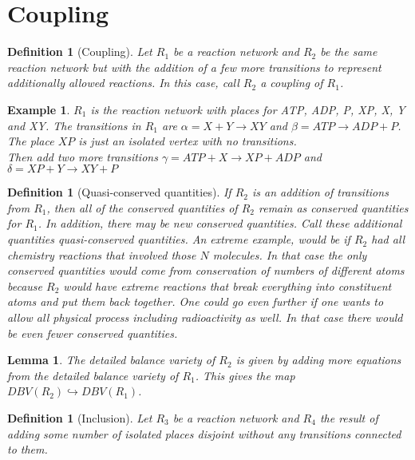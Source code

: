 \documentclass[11pt]{book}
\theoremstyle{change}
\newtheorem{definition}[equation]{Definition}
\newtheorem{lemma}[equation]{Lemma}
\newtheorem{example}[equation]{Example}
\theoremstyle{nonumberplain}
\numberwithin{equation}{section}
\begin{document}
\section{Coupling}

\begin{definition}[Coupling]
Let $R_1$ be a reaction network and $R_2$ be the same reaction network but with the addition of a few more transitions to represent additionally allowed reactions. In this case, call $R_2$ a coupling of $R_1$.
\end{definition}

\begin{example}
$R_1$ is the reaction network with places for ATP, ADP, P, XP, X, Y and XY. The transitions in $R_1$ are $\alpha = X + Y \to XY$ and $\beta = ATP \to ADP + P$. The place $XP$ is just an isolated vertex with no transitions.\\

Then add two more transitions $\gamma = ATP + X \to XP + ADP$ and $\delta = XP + Y \to XY + P$
\end{example}

\begin{definition}[Quasi-conserved quantities]
If $R_2$ is an addition of transitions from $R_1$, then all of the conserved quantities of $R_2$ remain as conserved quantities for $R_1$. In addition, there may be new conserved quantities. Call these additional quantities quasi-conserved quantities. An extreme example, would be if $R_2$ had all chemistry reactions that involved those $N$ molecules. In that case the only conserved quantities would come from conservation of numbers of different atoms because $R_2$ would have extreme reactions that break everything into constituent atoms and put them back together. One could go even further if one wants to allow all physical process including radioactivity as well. In that case there would be even fewer conserved quantities.
\end{definition}

\begin{lemma}
The detailed balance variety of $R_2$ is given by adding more equations from the detailed balance variety of $R_1$. This gives the map $DBV(R_2) \hookrightarrow DBV(R_1)$.
\end{lemma}

\begin{definition}[Inclusion]
Let $R_3$ be a reaction network and $R_4$ the result of adding some number of isolated places disjoint without any transitions connected to them.
\end{definition}
\end{document}
